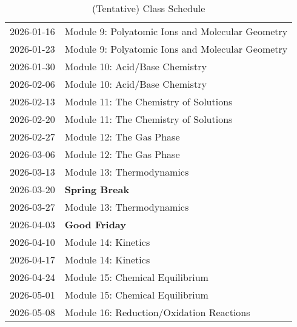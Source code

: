\documentclass[11pt, oneside]{article}   	%
\begin{document}
\begin{table}[h]
\begin{tabular}{ l | l }
2026-01-16 & Module 9: Polyatomic Ions and Molecular Geometry \\
2026-01-23 & Module 9: Polyatomic Ions and Molecular Geometry \\
2026-01-30 & Module 10: Acid/Base Chemistry \\
2026-02-06 & Module 10: Acid/Base Chemistry \\
2026-02-13 & Module 11: The Chemistry of Solutions \\
2026-02-20 & Module 11: The Chemistry of Solutions \\
2026-02-27 & Module 12: The Gas Phase \\
2026-03-06 & Module 12: The Gas Phase \\
2026-03-13 & Module 13: Thermodynamics \\
2026-03-20 & \textbf{Spring Break} \\
2026-03-27 & Module 13: Thermodynamics \\
2026-04-03 & \textbf{Good Friday} \\
2026-04-10 & Module 14: Kinetics \\
2026-04-17 & Module 14: Kinetics \\
2026-04-24 & Module 15: Chemical Equilibrium \\
2026-05-01 & Module 15: Chemical Equilibrium \\
2026-05-08 & Module 16: Reduction/Oxidation Reactions \\
\end{tabular}
\caption{(Tentative) Class Schedule}\label{table:class-schedule}
\end{table}
\end{document}
